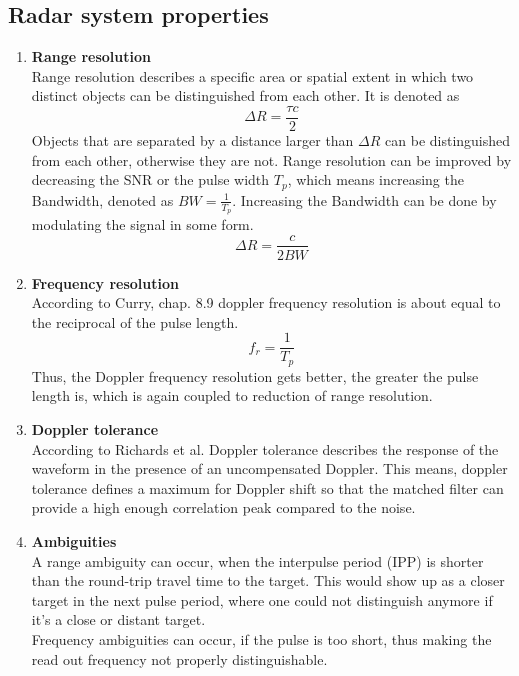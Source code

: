\subsection{Radar system properties}
\label{subsec:props}
\begin{enumerate}
	\item \textbf{Range resolution}\\
			Range resolution describes a specific area or spatial extent in which two distinct objects can be distinguished from each other. It is denoted as
			\begin{equation}
				\Delta R = \frac{\tau c}{2}
			\end{equation}
			Objects that are separated by a distance larger than $\Delta R$ can be distinguished from each other, otherwise they are not.
			Range resolution can be improved by decreasing the SNR or the pulse width $T_p$, which means increasing the Bandwidth, denoted as $BW = \frac{1}{T_p}$. Increasing the Bandwidth can be done by modulating the signal in some form.
			\begin{equation}
				\Delta R = \frac{c}{2 BW}
			\end{equation}
	\item \textbf{Frequency resolution}\\
			According to Curry, chap. 8.9 \citep{radarSystemPerformance} doppler frequency resolution is about equal to the reciprocal of the pulse length. 
			\begin{equation}
				f_r = \frac{1}{T_p}
			\end{equation}
			Thus, the Doppler frequency resolution gets better, the greater the pulse length is, which is again coupled to reduction of range resolution.
	\item \textbf{Doppler tolerance} \\
			According to Richards et al.\citep{richards2010principles} Doppler tolerance describes the response of the waveform in the presence of an uncompensated Doppler. This means, doppler tolerance defines a maximum for Doppler shift so that the matched filter can provide a high enough correlation peak compared to the noise.
	\item \textbf{Ambiguities} \\
			A range ambiguity can occur, when the interpulse period (IPP) is shorter than the round-trip travel time to the target. This would show up as a closer target in the next pulse period, where one could not distinguish anymore if it's a close or distant target.\\
			Frequency ambiguities can occur, if the pulse is too short, thus making the read out frequency not properly distinguishable.			
\end{enumerate}

